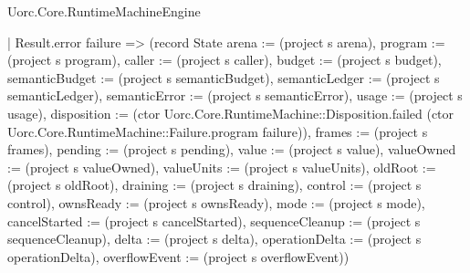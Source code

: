 \begin{lexlean}{Uorc.Core.RuntimeMachineEngine}
\begin{semanticmodule}
{        | Result.error failure => (record State {arena := (project s arena), program := (project s program), caller := (project s caller), budget := (project s budget), semanticBudget := (project s semanticBudget), semanticLedger := (project s semanticLedger), semanticError := (project s semanticError), usage := (project s usage), disposition := (ctor Uorc.Core.RuntimeMachine::Disposition.failed (ctor Uorc.Core.RuntimeMachine::Failure.program failure)), frames := (project s frames), pending := (project s pending), value := (project s value), valueOwned := (project s valueOwned), valueUnits := (project s valueUnits), oldRoot := (project s oldRoot), draining := (project s draining), control := (project s control), ownsReady := (project s ownsReady), mode := (project s mode), cancelStarted := (project s cancelStarted), sequenceCleanup := (project s sequenceCleanup), delta := (project s delta), operationDelta := (project s operationDelta), overflowEvent := (project s overflowEvent)})
}
\end{semanticmodule}
\end{lexlean}
